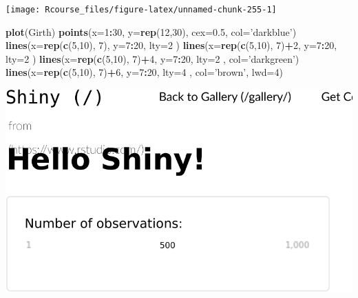 \documentclass[]{book}
\newenvironment{Shaded}{\begin{snugshade}}{\end{snugshade}}
\newcommand{\DataTypeTok}[1]{\textcolor[rgb]{0.13,0.29,0.53}{#1}}
\newcommand{\DecValTok}[1]{\textcolor[rgb]{0.00,0.00,0.81}{#1}}
\newcommand{\FloatTok}[1]{\textcolor[rgb]{0.00,0.00,0.81}{#1}}
\newcommand{\KeywordTok}[1]{\textcolor[rgb]{0.13,0.29,0.53}{\textbf{#1}}}
\newcommand{\NormalTok}[1]{#1}
\newcommand{\OperatorTok}[1]{\textcolor[rgb]{0.81,0.36,0.00}{\textbf{#1}}}
\newcommand{\StringTok}[1]{\textcolor[rgb]{0.31,0.60,0.02}{#1}}
\theoremstyle{definition}
\theoremstyle{definition}
\theoremstyle{definition}
\theoremstyle{remark}
\begin{document}
\texttt{[image: Rcourse\_files/figure-latex/unnamed-chunk-255-1]}

\begin{Shaded}
\begin{Highlighting}[]
\KeywordTok{plot}\NormalTok{(Girth)}
\KeywordTok{points}\NormalTok{(}\DataTypeTok{x=}\DecValTok{1}\OperatorTok{:}\DecValTok{30}\NormalTok{, }\DataTypeTok{y=}\KeywordTok{rep}\NormalTok{(}\DecValTok{12}\NormalTok{,}\DecValTok{30}\NormalTok{), }\DataTypeTok{cex=}\FloatTok{0.5}\NormalTok{, }\DataTypeTok{col=}\StringTok{'darkblue'}\NormalTok{)}
\KeywordTok{lines}\NormalTok{(}\DataTypeTok{x=}\KeywordTok{rep}\NormalTok{(}\KeywordTok{c}\NormalTok{(}\DecValTok{5}\NormalTok{,}\DecValTok{10}\NormalTok{), }\DecValTok{7}\NormalTok{), }\DataTypeTok{y=}\DecValTok{7}\OperatorTok{:}\DecValTok{20}\NormalTok{, }\DataTypeTok{lty=}\DecValTok{2}\NormalTok{ )}
\KeywordTok{lines}\NormalTok{(}\DataTypeTok{x=}\KeywordTok{rep}\NormalTok{(}\KeywordTok{c}\NormalTok{(}\DecValTok{5}\NormalTok{,}\DecValTok{10}\NormalTok{), }\DecValTok{7}\NormalTok{)}\OperatorTok{+}\DecValTok{2}\NormalTok{, }\DataTypeTok{y=}\DecValTok{7}\OperatorTok{:}\DecValTok{20}\NormalTok{, }\DataTypeTok{lty=}\DecValTok{2}\NormalTok{ )}
\KeywordTok{lines}\NormalTok{(}\DataTypeTok{x=}\KeywordTok{rep}\NormalTok{(}\KeywordTok{c}\NormalTok{(}\DecValTok{5}\NormalTok{,}\DecValTok{10}\NormalTok{), }\DecValTok{7}\NormalTok{)}\OperatorTok{+}\DecValTok{4}\NormalTok{, }\DataTypeTok{y=}\DecValTok{7}\OperatorTok{:}\DecValTok{20}\NormalTok{, }\DataTypeTok{lty=}\DecValTok{2}\NormalTok{ , }\DataTypeTok{col=}\StringTok{'darkgreen'}\NormalTok{)}
\KeywordTok{lines}\NormalTok{(}\DataTypeTok{x=}\KeywordTok{rep}\NormalTok{(}\KeywordTok{c}\NormalTok{(}\DecValTok{5}\NormalTok{,}\DecValTok{10}\NormalTok{), }\DecValTok{7}\NormalTok{)}\OperatorTok{+}\DecValTok{6}\NormalTok{, }\DataTypeTok{y=}\DecValTok{7}\OperatorTok{:}\DecValTok{20}\NormalTok{, }\DataTypeTok{lty=}\DecValTok{4}\NormalTok{ , }\DataTypeTok{col=}\StringTok{'brown'}\NormalTok{, }\DataTypeTok{lwd=}\DecValTok{4}\NormalTok{)}
\end{Highlighting}
\end{Shaded}

\includegraphics[width=0.5\linewidth]{Rcourse_files/figure-latex/unnamed-chunk-256-1}
\end{document}
